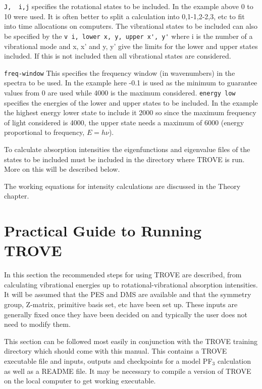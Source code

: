 \verb|J,  i,j| specifies the rotational states to be included. In the example above 0 to 10 were used. It is often 
better to split a calculation into 0,1-1,2-2,3, etc to fit into time allocations on computers.
The vibrational states to be included can also be specified by the \verb|v i, lower x, y, upper x', y'| 
where i is the number of a vibrational mode and x, x' and y, y' give the 
limits for the lower and upper states included. If this is not included then all vibrational states are considered. 


\verb|freq-window| This specifies the frequency window (in wavenumbers) in the spectra to be used. 
In the example here -0.1 is used as the minimum to guarantee values from 0 are used while 4000 is the maximum considered. 
\verb|energy low| specifies the energies of the lower and upper states to be included. In the example the highest energy lower state to include it 2000 so since the maximum frequency of light considered is 4000, the upper state needs a maximum of 6000 (energy proportional to frequency, $E = h \nu$).

To calculate absorption intensities the eigenfunctions and eigenvalue files of the states to be included must be included 
in the directory where TROVE is run. More on this will be described below. 

The working equations for intensity calculations are discussed in the Theory chapter.




\section{Practical Guide to Running TROVE}
In this section the recommended steps for using TROVE are described, 
from calculating vibrational energies up to rotational-vibrational absorption intensities. 
It will be assumed that the PES and DMS are available and that the symmetry group, Z-matrix, 
primitive basis set, etc have been set up. These inputs are generally fixed
once they have been decided on and typically the user does not need to modify them.

This section can be followed most easily in conjunction with the TROVE training directory which should come
with this manual. This contains a TROVE executable file and inputs, outputs and checkpoints for a model
PF$_3$ calculation as well as a README file. It may be necessary to compile a version of TROVE on the local 
computer to get working executable. 

